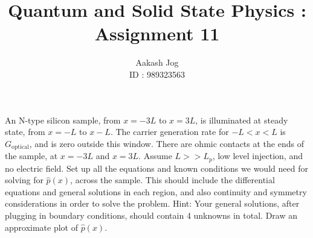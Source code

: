 \documentclass[fleqn, a4paper, 11pt, oneside]{amsart}
\title{Quantum and Solid State Physics : Assignment 11}
\author
{
	Aakash Jog\\
	ID : 989323563
}
\date{\formatdate{7}{1}{2016}}
\theoremstyle{definition}
\theoremstyle{theorem}
\begin{document}

\maketitle

\begin{question}
	An N-type silicon sample, from $x = -3 L$ to $x = 3 L$, is illuminated at steady state, from $x = -L$ to $x - L$.
	The carrier generation rate for $-L < x < L$ is $G_{\text{optical}}$, and is zero outside this window.
	There are ohmic contacts at the ends of the sample, at $x = -3 L$ and $x = 3 L$.
	Assume $L >> L_p$, low level injection, and no electric field.
	Set up all the equations and known conditions we would need for solving for $\hat{p}(x)$, across the sample.
	This should include the differential equations and general solutions in each region, and also continuity and symmetry considerations in order to solve the problem.
	Hint: Your general solutions, after plugging in boundary conditions, should contain 4 unknowns in total.
	Draw an approximate plot of $\hat{p}(x)$.
\end{question}
\end{document}
